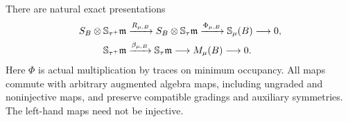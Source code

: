 \begin{theorem}
\label{thm:two-schur-presentation}
There are natural exact presentations
\begin{align*}
 S_B\otimes\mathbb S_{\tau^+}\mathfrak m
 &\xrightarrow{R_{\mu,B}}
 S_B\otimes\mathbb S_\tau\mathfrak m
 \xrightarrow{\Phi_{\mu,B}}\mathbb S_\mu(B)\longrightarrow0,\\
 \mathbb S_{\tau^+}\mathfrak m
 &\xrightarrow{\beta_{\mu,B}}\mathbb S_\tau\mathfrak m
               \longrightarrow M_\mu(B)\longrightarrow0.
\end{align*}
Here $\Phi$ is actual multiplication by traces on minimum occupancy.
All maps commute with arbitrary augmented algebra maps, including
ungraded and noninjective maps, and preserve compatible gradings and
auxiliary symmetries. The left-hand maps need not be injective.
\end{theorem}

